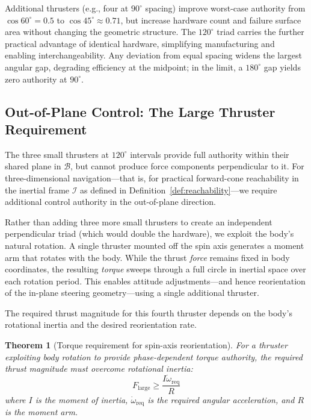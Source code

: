 \documentclass{article}
\newtheorem{theorem}{Theorem}
\begin{document}
Additional thrusters (e.g., four at $90^\circ$ spacing) improve worst-case authority from $\cos 60^\circ = 0.5$ to $\cos 45^\circ \approx 0.71$, but increase hardware count and failure surface area without changing the geometric structure. The $120^\circ$ triad carries the further practical advantage of identical hardware, simplifying manufacturing and enabling interchangeability. Any deviation from equal spacing widens the largest angular gap, degrading efficiency at the midpoint; in the limit, a $180^\circ$ gap yields zero authority at $90^\circ$.


\subsection{Out-of-Plane Control: The Large Thruster Requirement}
\label{sec:large_thruster}

The three small thrusters at $120^\circ$ intervals provide full authority within their shared plane in $\mathcal{B}$, but cannot produce force components perpendicular to it. For three-dimensional navigation---that is, for practical forward-cone reachability in the inertial frame $\mathcal{I}$ as defined in Definition~\ref{def:reachability}---we require additional control authority in the out-of-plane direction.

Rather than adding three more small thrusters to create an independent perpendicular triad (which would double the hardware), we exploit the body's natural rotation. A single thruster mounted off the spin axis generates a moment arm that rotates with the body. While the thrust \emph{force} remains fixed in body coordinates, the resulting \emph{torque} sweeps through a full circle in inertial space over each rotation period. This enables attitude adjustments---and hence reorientation of the in-plane steering geometry---using a single additional thruster.

The required thrust magnitude for this fourth thruster depends on the body's rotational inertia and the desired reorientation rate.

\begin{theorem}[Torque requirement for spin-axis reorientation]
\label{thm:torque_req}
For a thruster exploiting body rotation to provide phase-dependent torque authority, the required thrust magnitude must overcome rotational inertia:
\begin{equation}
    F_{\text{large}} \geq \frac{I \dot{\omega}_{\text{req}}}{R}
\end{equation}
where $I$ is the moment of inertia, $\dot{\omega}_{\text{req}}$ is the required angular acceleration, and $R$ is the moment arm.
\end{theorem}
\end{document}
